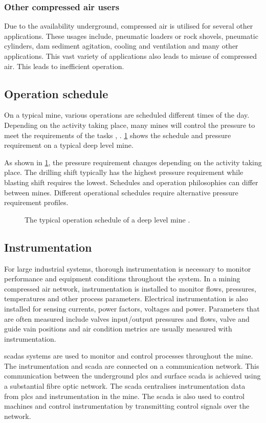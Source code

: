\subsubsection{Other compressed air users}
Due to the availability underground, compressed air is utilised for several other applications. These usages include, pneumatic loaders or rock shovels, pneumatic cylinders, dam sediment agitation, cooling and ventilation and many other applications. This vast variety of applications also leads to misuse of compressed air. This leads to inefficient operation.
\subsection{Operation schedule}
On a typical mine, various operations are scheduled different times of the day. Depending on the activity taking place, many mines will control the pressure to meet the requirements of the tasks \cite{Kriel2014Masters}, \cite{Marais2012PhD}. \cref{fig: Mining schedule} shows the schedule and pressure requirement on a typical deep level mine.\par 
As shown in \cref{fig: Mining schedule}, the pressure requirement changes depending on the activity taking place. The drilling shift typically has the highest pressure requirement while blasting shift requires the lowest. Schedules and operation philosophies can differ between mines. Different operational schedules require alternative pressure requirement profiles.
\begin{figure}[h]
	\centering
	\fbox{}
	\caption[A typical operation schedule of a deep level mine.]{The typical operation schedule of a deep level mine \cite{Kriel2014Masters}.}
	\label{fig: Mining schedule}
\end{figure}
\subsection{Instrumentation}
For large industrial systems, thorough instrumentation is necessary to monitor performance and equipment conditions throughout the system. In a mining compressed air network, instrumentation is installed to monitor flows, pressures, temperatures and other process parameters. Electrical instrumentation is also installed for sensing currents, power factors, voltages and power. Parameters that are often measured include valves input/output pressures and flows, valve and guide vain positions and air condition metrics are usually measured with instrumentation.	
\par
\Glspl{scada} systems are used to monitor and control processes throughout the mine. The instrumentation and \gls{scada} are connected on a communication network.
This communication between the underground \glspl{plc} and surface \gls{scada} is achieved using a substantial fibre optic network\cite{schroeder2009energy}. The \gls{scada} centralises instrumentation data from \glspl{plc} and instrumentation in the mine. The \gls{scada} is also used to control machines and control instrumentation by transmitting control signals over the network. 
